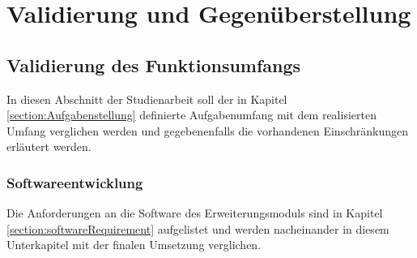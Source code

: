
\chapter{Validierung und Gegenüberstellung}


\section{Validierung des Funktionsumfangs}

In diesen Abschnitt der Studienarbeit soll der in Kapitel \ref{section:Aufgabenstellung} definierte Aufgabenumfang mit dem realisierten Umfang verglichen werden und gegebenenfalls die vorhandenen Einschränkungen erläutert werden.

\subsection{Softwareentwicklung}
Die Anforderungen an die Software des Erweiterungsmoduls sind in Kapitel \ref{section:softwareRequirement} aufgelistet und werden nacheinander in diesem Unterkapitel mit der finalen Umsetzung verglichen.

